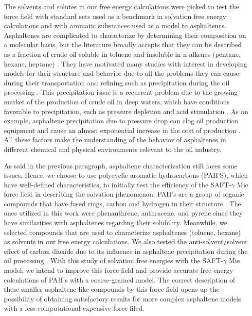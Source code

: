 The solvents and solutes in our free energy calculations were picked to test the force field with standard sets used as a benchmark in solvation free energy calculations and with aromatic substances used as a model to asphaltenes. Asphaltenes are complicated to characterize by determining their composition on a molecular basis, but the literature broadly accepts that they can be described as a fraction of crude oil soluble in toluene and insoluble in n-alkenes (pentane, hexane, heptane) \cite{SJOBLOM2003399}. They have motivated many studies with interest in developing models for their structure and behavior due to all the problems they can cause during their transportation and refining such as precipitation during the oil processing \cite{SJOBLOM20151}. This precipitation issue is a recurrent problem due to the growing market of the production of crude oil in deep waters, which have conditions favorable to precipitation, such as pressure depletion and acid stimulation \cite{AIC:AIC10243}. As an example, asphaltene precipitation due to pressure drop can clog oil production equipment and cause an almost exponential increase in the cost of production \cite{AIC:AIC10243,doi:10.1021/ef010047l}. All these factors make the understanding of the behavior of asphaltenes in different chemical and physical environments relevant to the oil industry. 

As said in the previous paragraph, asphaltene characterization still faces some issues. Hence, we choose to use polycyclic aromatic hydrocarbons (PAH'S), which have well-defined characteristics, to initially test the efficiency of the SAFT-$\gamma$ Mie force field in describing the solvation phenomenon. PAH's are a group of organic compounds that have fused rings, carbon and hydrogen in their structure \cite{RAVINDRA20082895}. The ones utilized in this work were phenanthrene, anthracene, and pyrene since they have similarities with asphaltenes regarding their solubility. Meanwhile,  we selected compounds that are used to characterize asphaltenes (toluene, hexane) as solvents in our free energy calculations. We also tested the anti-solvent/solvent effect of carbon dioxide due to its influence in asphaltene precipitation during the oil processing \cite{SOROUSH2014405}. With this study of solvation free energies with the SAFT-$\gamma$ Mie model, we intend to improve this force field and provide accurate free energy calculations of PAH's with a coarse-grained model. The correct description of these smaller asphaltene-like compounds by this force field opens up the possibility of obtaining satisfactory results for more complex asphaltene models with a less computational expensive force filed.

